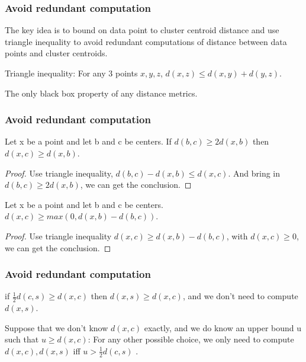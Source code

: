 \documentclass[9pt]{beamer}
\newcommand{\ccp}[1]{{\color{purple}#1}}
\begin{document}
\begin{frame}
	\frametitle{Avoid redundant computation}
	The key idea is to \ccp{bound on data point} to cluster centroid distance and use \ccp{triangle inequality} to avoid redundant computations of distance between data points and cluster centroids.
	\begin{lemma}
		Triangle inequality: For any 3 points $x, y, z$, $d(x,z) \le d(x, y) + d(y, z)$.
	\end{lemma}
	The only black box property of any distance metrics.
\end{frame}

\begin{frame}
	\frametitle{Avoid redundant computation}
	\begin{lemma}
		Let x be a point and let b and c be centers. If $d(b, c) \ge 2d(x,b)$ then $d(x,c) \ge d(x,b)$.
	\end{lemma}
	\begin{proof}
		Use triangle inequality, $d(b,c) - d(x,b)\le d(x,c)$. And bring in $d(b, c) \ge 2d(x,b)$, we can get the conclusion.
	\end{proof}
	\pause
	\begin{lemma}
		Let x be a point and let b and c be centers. $d(x,c) \ge max(0, d(x,b)-d(b,c))$.
	\end{lemma}
	\begin{proof}
		Use triangle inequality $d(x,c) \ge d(x,b)-d(b,c)$, with $d(x,c) \ge 0$, we can get the conclusion.
	\end{proof}
\end{frame}

\begin{frame}
	\frametitle{Avoid redundant computation}
	\begin{corollary}
		if $\frac{1}{2}d(c, s) \ge d(x,c)$ then $d(x, s) \ge d(x, c)$, and we \ccp{don't need to compute $d(x,s)$.}
	\end{corollary}
	\pause
	\begin{corollary}
		Suppose that we don't know $d(x,c)$ exactly, and we do know an upper bound u such that $u \ge d(x,c)$: For any other possible choice, \ccp{we only need to compute $d(x, c), d(x, s)$ iff $u > \frac{1}{2}d(c, s)$ .}
	\end{corollary}

\end{frame}
\end{document}
